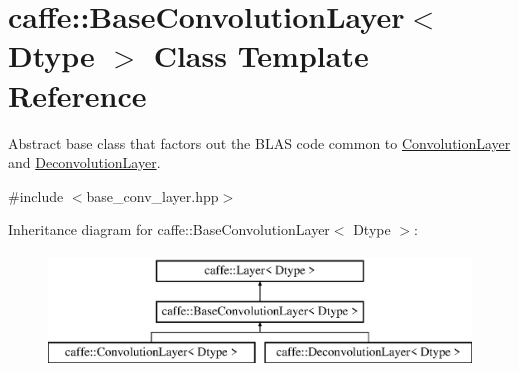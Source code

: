 \hypertarget{classcaffe_1_1BaseConvolutionLayer}{}\section{caffe\+:\+:Base\+Convolution\+Layer$<$ Dtype $>$ Class Template Reference}
\label{classcaffe_1_1BaseConvolutionLayer}


Abstract base class that factors out the B\+L\+AS code common to \hyperlink{classcaffe_1_1ConvolutionLayer}{Convolution\+Layer} and \hyperlink{classcaffe_1_1DeconvolutionLayer}{Deconvolution\+Layer}.  




{\ttfamily \#include $<$base\+\_\+conv\+\_\+layer.\+hpp$>$}

Inheritance diagram for caffe\+:\+:Base\+Convolution\+Layer$<$ Dtype $>$\+:\begin{figure}[H]
\begin{center}
\leavevmode
\includegraphics[height=3.000000cm]{classcaffe_1_1BaseConvolutionLayer}
\end{center}
\end{figure}
